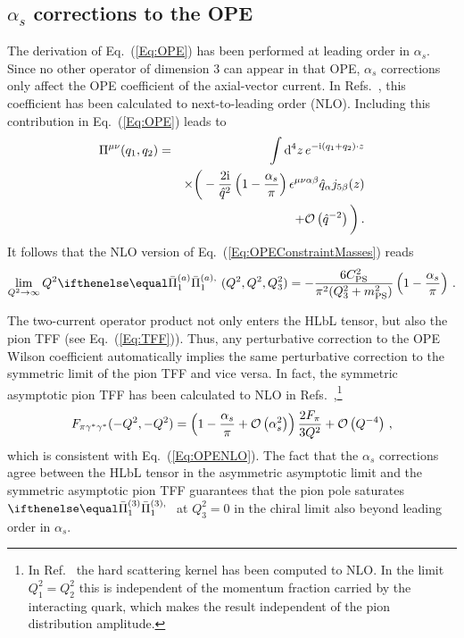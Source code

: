 
\subsection{\texorpdfstring{$\alpha_s$}{alpha\_s} corrections to the OPE}
\label{Sec:MVpert}

The derivation of Eq.~(\ref{Eq:OPE}) has been performed at leading order in $\alpha_s$. Since no other operator of dimension 3 can appear in that OPE, $\alpha_s$ corrections only affect the OPE coefficient of the axial-vector current. In Refs.~\cite{Kodaira:1978sh, Kodaira:1979ib, Kodaira:1979pa}, this coefficient has been calculated to next-to-leading order (NLO). Including this contribution in Eq.~(\ref{Eq:OPE}) leads to
\begin{eqnarray}
\Pi^{\mu\nu}(q_1, q_2) & = & \int \mathop{}\!\mathrm{d}^4 z \,e^{-\text{i}(q_1 + q_2) \cdot z} \nonumber \\
&&\times\bigg(-\frac{2\text{i}}{\hat{q}^2} \left(1 - \frac{\alpha_s}{\pi}\right) \epsilon^{\mu\nu\alpha\beta} \hat{q}_\alpha j_{5\beta}(z) \nonumber\\
&&\qquad+ \mathcal{O}\left(\hat{q}^{-2}\right)\bigg)\,.
\label{Eq:OPENLO}
\end{eqnarray}
It follows that the NLO version of Eq.~(\ref{Eq:OPEConstraintMasses}) reads
\begin{equation}
\lim\limits_{Q^2 \to \infty} Q^2 \PiPS(Q^2, Q^2, Q_3^2) = -\frac{6 C_\text{PS}^2 }{\pi^2 (Q_3^2 + m_\text{PS}^2)}\left(1-\frac{\alpha_s}{\pi}\right)\, .
\label{Eq:OPEConstraintNLO}
\end{equation}

The two-current operator product not only enters the HLbL tensor, but also the pion TFF (see Eq.~(\ref{Eq:TFF})). Thus, any perturbative correction to the OPE Wilson coefficient automatically implies the same perturbative correction to the symmetric limit of the pion TFF and vice versa. In fact, the symmetric asymptotic pion TFF has been calculated to NLO in Refs.~\cite{Braaten,PionTFF},\footnote{In Ref.~\cite{Braaten} the hard scattering kernel has been computed to NLO. In the limit $Q_1^2 = Q_2^2$ this is independent of the momentum fraction carried by the interacting quark, which makes the result independent of the pion distribution amplitude.}
\begin{equation}
F_{\pi\gamma^*\gamma^*}(-Q^2,-Q^2) = \left(1 - \frac{\alpha_s}{\pi} + \mathcal{O}\left(\alpha_s^2\right)\right)\frac{2 F_\pi}{3Q^2} + \mathcal{O}\left(Q^{-4}\right)\,,
\end{equation}
which is consistent with Eq.~(\ref{Eq:OPENLO}). The fact that the $\alpha_s$ corrections agree between the HLbL tensor in the asymmetric asymptotic limit and the symmetric asymptotic pion TFF guarantees that the pion pole saturates $\Pipion$ at $Q_3^2 = 0$ in the chiral limit also beyond leading order in $\alpha_s$.

